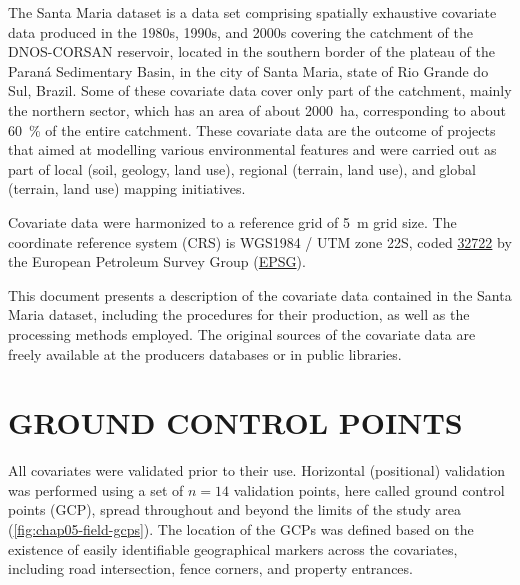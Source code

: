 The Santa Maria dataset is a data set comprising spatially exhaustive covariate data produced in the 1980s, 
1990s, and 2000s covering the catchment of the DNOS-CORSAN reservoir, located in the southern border of the 
plateau of the Paraná Sedimentary Basin, in the city of Santa Maria, state of Rio Grande do Sul, Brazil. Some 
of these covariate data cover only part of the catchment, mainly the northern sector, which has an area of 
about
\SI{2000}{\hectare}, corresponding to about \SI{60}{\percent} of the entire catchment. These covariate data 
are the outcome of projects that aimed at modelling various environmental features and were carried out as 
part of local (soil, geology, land use), regional (terrain, land use), and global (terrain, land use) mapping 
initiatives.

Covariate data were harmonized to a reference grid of \SI{5}{\m} grid size. The coordinate reference 
system (CRS) is WGS1984 / UTM zone 22S, coded \href{http://spatialreference.org/ref/epsg/32722/}{\num{32722}} 
by the European Petroleum Survey Group (\href{http://www.epsg.org/}{EPSG}).

This document presents a description of the covariate data contained in the Santa Maria dataset, including the 
procedures for their production, as well as the processing methods employed. The original sources of the 
covariate data are freely available at the producers databases or in public libraries.

\section{GROUND CONTROL POINTS}
\label{sec:chap05-gcp}

All covariates were validated prior to their use. Horizontal (positional) validation was performed using a set 
of $n = 14$ validation points, here called ground control points (GCP), spread throughout and beyond the 
limits of the study area (\autoref{fig:chap05-field-gcps}). The location of the GCPs was defined based on 
the existence of easily identifiable geographical markers across the covariates, including road intersection, 
fence corners, and property entrances.

